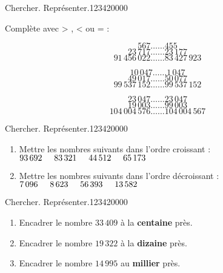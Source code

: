 \begin{pageAD} 
 

 
\begin{ExoCad}{Chercher. Représenter.}{1234}{2}{0}{0}{0}{0}

 Complète avec > , < ou = :
 
 \begin{minipage}{0.3\linewidth}
  \[567 \ldots\ldots 455\]
  \[23\,717 \ldots\ldots 23\,177 \]
  \[91\,456\,022 \ldots\ldots 83\,427\,923\]
  \end{minipage}\hfill
 \begin{minipage}{0.3\linewidth}
  \[10\,047 \ldots\ldots 1\,047 \]
  \[49\,017 \ldots\ldots 50\,077 \]
  \[99\,537\,152 \ldots\ldots 99\,537\,152 \]
  \end{minipage}
  \hfill
 \begin{minipage}{0.3\linewidth}
  \[23\,047 \ldots\ldots 23\,047 \]
  \[19\,003 \ldots\ldots 99\,003 \]
  \[104\,004\,576  \ldots\ldots 104\,004\,567 \]
  \end{minipage}  
  
\end{ExoCad} 
  
  
\begin{ExoCad}{Chercher. Représenter.}{1234}{2}{0}{0}{0}{0}
 
\begin{enumerate}[leftmargin=*]
 \item Mettre les nombres suivants dans l'ordre croissant : $93\,692 \hspace{.5cm} 83\,321 \hspace{.5cm} 44\,512 \hspace{.5cm} 65\,173$ 
 
 \item Mettre les nombres suivants dans l'ordre décroissant : $7\,096 \hspace{.5cm} 8\,623 \hspace{.5cm} 56\,393 \hspace{.5cm} 13\,582$	
 
\end{enumerate}
\end{ExoCad} 
 


\begin{ExoCad}{Chercher. Représenter.}{1234}{2}{0}{0}{0}{0}
\begin{enumerate}[leftmargin=*]  
\item Encadrer le nombre $33\,409$ à la \textbf{centaine} près. 
\item Encadrer le nombre $19\,322$ à la \textbf{dizaine} près.  
\item Encadrer le nombre $14\,995$ au \textbf{millier} près.  
\end{enumerate}
\end{ExoCad}
    

\end{pageAD}

